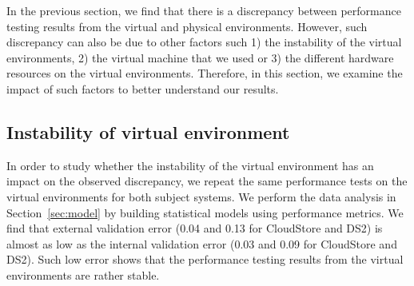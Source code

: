 
In the previous section, we find that there is a discrepancy between performance testing results from the virtual and physical environments. However, such discrepancy can also be due to other factors such 1) the instability of the virtual environments, 2) the virtual machine that we used or 3) the different hardware resources on the virtual environments. Therefore, in this section, we examine the impact of such factors to better understand our results. 


\subsection{Instability of virtual environment}


In order to study whether the instability of the virtual environment has an impact on the observed discrepancy, we repeat the same performance tests on the virtual environments for both subject systems. We perform the data analysis in Section~\ref{sec:model} by building statistical models using performance metrics. %
We find that external validation error (0.04 and 0.13 for CloudStore and DS2) is almost as low as the internal validation error (0.03 and 0.09 for CloudStore and DS2). Such low error shows that the performance testing results from the virtual environments are rather stable. 


